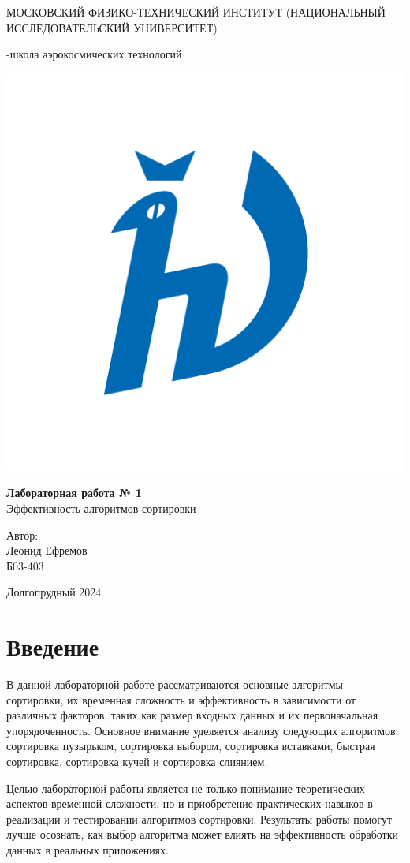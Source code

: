 \documentclass[a4paper,12pt]{article} %
\begin{document}
\begin{titlepage}
\begin{center}
    {\large МОСКОВСКИЙ ФИЗИКО-ТЕХНИЧЕСКИЙ ИНСТИТУТ (НАЦИОНАЛЬНЫЙ ИССЛЕДОВАТЕЛЬСКИЙ УНИВЕРСИТЕТ)}
\end{center}
\begin{center}
    {-школа аэрокосмических технологий}
\end{center}

\vspace{3.5cm}

\begin{center}
    \includegraphics[width=0.4\linewidth]{hv_full.png}
\end{center}
\vspace{0.1cm}
{\huge
\begin{center}
    {\bf Лабораторная работа № 1}\\
    Эффективность алгоритмов сортировки    
\end{center}
}
\vspace{0.5cm}
\begin{flushright}
{\LARGE Автор:\\ 
Леонид Ефремов \\ 
\vspace{0.2cm}
Б03-403}
\end{flushright}
\vspace{3.5cm}
\begin{center}
    Долгопрудный 2024
\end{center}
\end{titlepage}

\tableofcontents
\section{Введение}

В данной лабораторной работе рассматриваются основные алгоритмы сортировки, их временная сложность и эффективность в зависимости от различных факторов, таких как размер входных данных и их первоначальная упорядоченность. Основное внимание уделяется анализу следующих алгоритмов: сортировка пузырьком, сортировка выбором, сортировка вставками, быстрая сортировка, сортировка кучей и сортировка слиянием.\par
Целью лабораторной работы является не только понимание теоретических аспектов временной сложности, но и приобретение практических навыков в реализации и тестировании алгоритмов сортировки. Результаты работы помогут лучше осознать, как выбор алгоритма может влиять на эффективность обработки данных в реальных приложениях.
\end{document}
